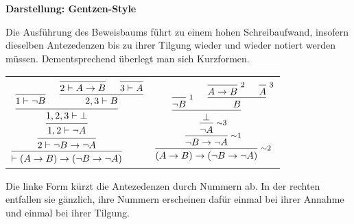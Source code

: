 \documentclass[8pt]{beamer}
\newcommand{\strong}[1]{\textsf{\textbf{#1}}}
\newcommand{\infernote}[1]{\!\text{\footnotesize #1}}
\newcommand{\discharge}[1]{$\sim$#1}
\newcommand{\parspace}{\vspace{0.8em}}
\newcommand{\cond}{\rightarrow}
\begin{document}
\begin{frame}[t]
\vspace{0.5em}
\strong{Darstellung: Gentzen-Style}

\parspace
Die Ausführung des Beweisbaums führt zu einem hohen Schreibaufwand,
insofern dieselben Antezedenzen bis zu ihrer Tilgung wieder und wieder
notiert werden müssen. Dementsprechend überlegt man sich Kurzformen.

\parspace
\begin{center}
\begin{tabular}{l@{\qquad\quad}l}
$\begin{prooftree}
        \infer0{1\vdash\neg B}
          \infer0{2\vdash A\cond B}
          \infer0{3\vdash A}
        \infer2{2, 3\vdash B}
      \infer2{1, 2, 3\vdash \bot}
    \infer1{1, 2\vdash \neg A}
  \infer1{2\vdash \neg B\cond\neg A}
\infer1{\vdash (A\cond B)\cond (\neg B\cond\neg A)}
\end{prooftree}$
&
$\begin{prooftree}
        \infer0[\infernote{1}]{\neg B}
          \infer0[\infernote{2}]{A\cond B}
          \infer0[\infernote{3}]{A}
        \infer2{B}
      \infer2{\bot}
    \infer1[\infernote{\discharge 3}]{\neg A}
  \infer1[\infernote{\discharge 1}]{\neg B\cond\neg A}
 \infer1[\infernote{\discharge 2}]{(A\cond B)\cond (\neg B\cond\neg A)}
\end{prooftree}$
\end{tabular}
\end{center}

\parspace
Die linke Form kürzt die Antezedenzen durch Nummern ab. In der rechten
entfallen sie gänzlich, ihre Nummern erscheinen dafür einmal bei ihrer
Annahme und einmal bei ihrer Tilgung.
\end{frame}
\end{document}
